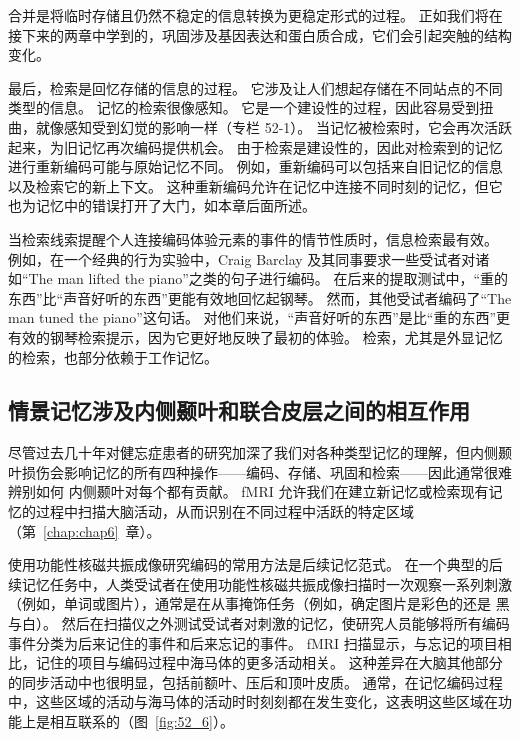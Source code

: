 合并是将临时存储且仍然不稳定的信息转换为更稳定形式的过程。
正如我们将在接下来的两章中学到的，巩固涉及基因表达和蛋白质合成，它们会引起突触的结构变化。


最后，检索是回忆存储的信息的过程。
它涉及让人们想起存储在不同站点的不同类型的信息。
记忆的检索很像感知。
它是一个建设性的过程，因此容易受到扭曲，就像感知受到幻觉的影响一样（专栏 52-1）。
当记忆被检索时，它会再次活跃起来，为旧记忆再次编码提供机会。
由于检索是建设性的，因此对检索到的记忆进行重新编码可能与原始记忆不同。
例如，重新编码可以包括来自旧记忆的信息以及检索它的新上下文。
这种重新编码允许在记忆中连接不同时刻的记忆，但它也为记忆中的错误打开了大门，如本章后面所述。


当检索线索提醒个人连接编码体验元素的事件的情节性质时，信息检索最有效。
例如，在一个经典的行为实验中，Craig Barclay 及其同事要求一些受试者对诸如“The man lifted the piano”之类的句子进行编码。
在后来的提取测试中，“重的东西”比“声音好听的东西”更能有效地回忆起钢琴。
然而，其他受试者编码了“The man tuned the piano”这句话。
对他们来说，“声音好听的东西”是比“重的东西”更有效的钢琴检索提示，因为它更好地反映了最初的体验。
检索，尤其是外显记忆的检索，也部分依赖于工作记忆。



\subsection{情景记忆涉及内侧颞叶和联合皮层之间的相互作用}

尽管过去几十年对健忘症患者的研究加深了我们对各种类型记忆的理解，但内侧颞叶损伤会影响记忆的所有四种操作——编码、存储、巩固和检索——因此通常很难辨别如何 内侧颞叶对每个都有贡献。
fMRI 允许我们在建立新记忆或检索现有记忆的过程中扫描大脑活动，从而识别在不同过程中活跃的特定区域（第~\ref{chap:chap6}~章）。


使用功能性核磁共振成像研究编码的常用方法是后续记忆范式。
在一个典型的后续记忆任务中，人类受试者在使用功能性核磁共振成像扫描时一次观察一系列刺激（例如，单词或图片），通常是在从事掩饰任务（例如，确定图片是彩色的还是 黑与白）。
然后在扫描仪之外测试受试者对刺激的记忆，使研究人员能够将所有编码事件分类为后来记住的事件和后来忘记的事件。
fMRI 扫描显示，与忘记的项目相比，记住的项目与编码过程中海马体的更多活动相关。
这种差异在大脑其他部分的同步活动中也很明显，包括前额叶、压后和顶叶皮质。
通常，在记忆编码过程中，这些区域的活动与海马体的活动时时刻刻都在发生变化，这表明这些区域在功能上是相互联系的（图~\ref{fig:52_6}）。



